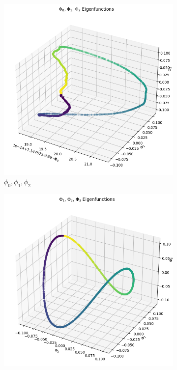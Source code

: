 \begin{figure}[H]
\centering
    \begin{subfigure}{.28\textwidth}
        \includegraphics[width=\linewidth]{images/ex3_task2_part3_3D_1.png}
        \caption{$\phi_0, \phi_1, \phi_2$}
    \end{subfigure}%
    \begin{subfigure}{.28\textwidth}
        \includegraphics[width=\linewidth]{images/ex3_task2_part3_3D_2.png}

\end{subfigure}
\end{figure}
